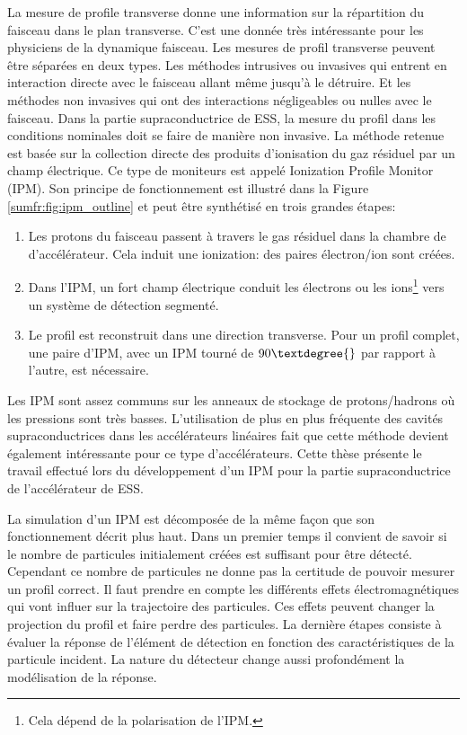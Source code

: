 La mesure de profile transverse donne une information sur la répartition du faisceau dans le plan transverse. C'est une donnée très intéressante pour les physiciens de la dynamique faisceau. Les mesures de profil transverse peuvent être séparées en deux types. Les méthodes intrusives ou invasives qui entrent en interaction directe avec le faisceau allant même jusqu'à le détruire. Et les méthodes non invasives qui ont des interactions négligeables ou nulles avec le faisceau. Dans la partie supraconductrice de ESS, la mesure du profil dans les conditions nominales doit se faire de manière non invasive. La méthode retenue est basée sur la collection directe des produits d'ionisation du gaz résiduel par un champ électrique. Ce type de moniteurs est appelé Ionization Profile Monitor (IPM). Son principe de fonctionnement est illustré dans la Figure \ref{sumfr:fig:ipm_outline} et peut être synthétisé en trois grandes étapes:

\begin{enumerate}
  \item Les protons du faisceau passent à travers le gas résiduel dans la chambre de d'accélérateur. Cela induit une ionization: des paires électron/ion sont créées.
  \item Dans l'IPM, un fort champ électrique conduit les électrons ou les ions\footnote{Cela dépend de la polarisation de l'IPM.} vers un système de détection segmenté.
  \item Le profil est reconstruit dans une direction transverse. Pour un profil complet, une paire d'IPM, avec un IPM tourné de $90\textdegree{}$ par rapport à l'autre, est nécessaire.
\end{enumerate}
Les IPM sont assez communs sur les anneaux de stockage de protons/hadrons où les pressions sont très basses. L’utilisation de plus en plus fréquente des cavités supraconductrices dans les accélérateurs linéaires fait que cette méthode devient également intéressante pour ce type d'accélérateurs. Cette thèse présente le travail effectué lors du développement d’un IPM pour la partie supraconductrice de l’accélérateur de ESS.

La simulation d’un IPM est décomposée de la même façon que son fonctionnement décrit plus haut. Dans un premier temps il convient de savoir si le nombre de particules initialement créées est suffisant pour être détecté. Cependant ce nombre de particules ne donne pas la certitude de pouvoir mesurer un profil correct. Il faut prendre en compte les différents effets électromagnétiques qui vont influer sur la trajectoire des particules. Ces effets peuvent changer la projection du profil et faire perdre des particules. La dernière étapes consiste à évaluer la réponse de l'élément de détection en fonction des caractéristiques de la particule incident. La nature du détecteur change aussi profondément la modélisation de la réponse.

